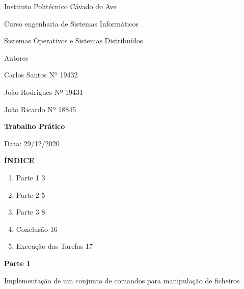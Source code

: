 \documentclass{article}
\begin{document}
	\centerline{Instituto Politécnico Cávado do Ave \linebreak}
	\vspace*{1 em}
	\centerline{Curso engenharia de Sistemas Informáticos \linebreak}
	\vspace*{1 em}
	\centerline{Sistemas Operativos e Sistemas Distribuídos\linebreak}
	\vspace*{5 em}
	
	\centerline{Autores}
	
	\vspace*{3 em}
	\centerline{Carlos Santos Nº 19432\linebreak}
	\vspace*{1 em}
	\centerline{João Rodrigues Nº 19431\linebreak}
	\vspace*{1 em}
	\centerline{João Ricardo Nº 18845 \linebreak}
	\vspace*{3 em}
	
	\centerline{\textbf{Trabalho Prático}}
	
	\vspace*{10 em}
	\centerline{Data: 29/12/2020}
	
	\newpage
	\centerline{\textbf{ÍNDICE}}
	\vspace*{3 em}
	
	\begin{enumerate}
		\item Parte 1 \hspace{30 em} 3 \\
		\item Parte 2 \hspace{30 em} 5\\
		\item Parte 3 \hspace{30 em} 8\\
		\item Conclusão \hspace{28,5 em} 16 \\
		\item Execução das Tarefas \hspace{24 em} 17 \\
	\end{enumerate}
	
	\newpage
	\centerline{\textbf{Parte 1}}
	\vspace*{1 em}
	\centerline{Implementação de um conjunto de comandos para manipulação de ficheiros}
	\vspace*{3 em}
	
\end{document}
